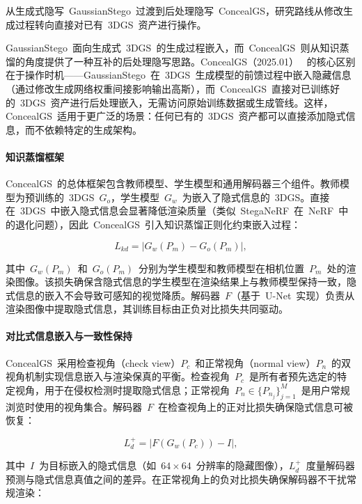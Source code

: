 从生成式隐写~GaussianStego~过渡到后处理隐写~ConcealGS，研究路线从修改生成过程转向直接对已有~3DGS~资产进行操作。

GaussianStego~面向生成式~3DGS~的生成过程嵌入，而~ConcealGS~则从知识蒸馏的角度提供了一种互补的后处理隐写思路。ConcealGS（2025.01）~\cite{2501_03605} 的核心区别在于操作时机——GaussianStego~在~3DGS~生成模型的前馈过程中嵌入隐藏信息（通过修改生成网络权重间接影响输出高斯），而~ConcealGS~直接对已训练好的~3DGS~资产进行后处理嵌入，无需访问原始训练数据或生成管线。这样，ConcealGS~适用于更广泛的场景：任何已有的~3DGS~资产都可以直接添加隐式信息，而不依赖特定的生成架构。

\paragraph{知识蒸馏框架}ConcealGS~的总体框架包含教师模型、学生模型和通用解码器三个组件。教师模型为预训练的~3DGS~$G_o$，学生模型~$G_w$~为嵌入了隐式信息的~3DGS。直接在~3DGS~中嵌入隐式信息会显著降低渲染质量（类似~StegaNeRF~在~NeRF~中的退化问题），因此~ConcealGS~引入知识蒸馏正则化约束嵌入过程：

\begin{equation}
    L_{kd} = |G_w(P_m) - G_o(P_m)|,
\end{equation}

其中~$G_w(P_m)$~和~$G_o(P_m)$~分别为学生模型和教师模型在相机位置~$P_m$~处的渲染图像。该损失确保含隐式信息的学生模型在渲染结果上与教师模型保持一致，隐式信息的嵌入不会导致可感知的视觉降质。解码器~$F$（基于~U-Net~实现）负责从渲染图像中提取隐式信息，其训练目标由正负对比损失共同驱动。

\paragraph{对比式信息嵌入与一致性保持}ConcealGS~采用检查视角（check view）$P_c$~和正常视角（normal view）$P_n$~的双视角机制实现信息嵌入与渲染保真的平衡。检查视角~$P_c$~是所有者预先选定的特定视角，用于在侵权检测时提取隐式信息；正常视角~$P_n \in \{P_{n_j}\}_{j=1}^M$~是用户常规浏览时使用的视角集合。解码器~$F$~在检查视角上的正对比损失确保隐式信息可被恢复：

\begin{equation}
    L_d^+ = |F(G_w(P_c)) - I|,
\end{equation}

其中~$I$~为目标嵌入的隐式信息（如~$64 \times 64$~分辨率的隐藏图像），$L_d^+$~度量解码器预测与隐式信息真值之间的差异。在正常视角上的负对比损失确保解码器不干扰常规渲染：

